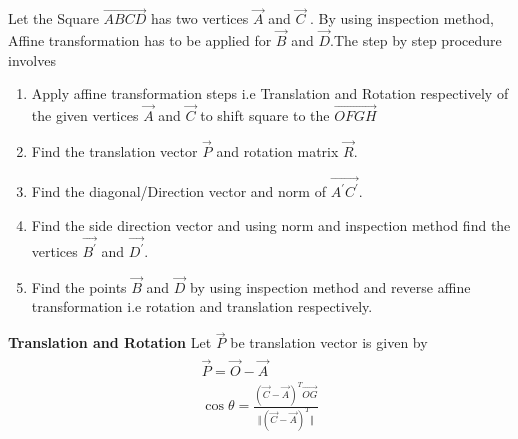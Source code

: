 \documentclass[journal,12pt,twocolumn]{IEEEtran}
\begin{document}
Let the Square $\vec{ABCD}$ has two vertices $\vec{A}$ and $\vec{C}$ . By using inspection method, Affine transformation has to be applied for $\vec{B}$ and $\vec{D}$.The step by step procedure involves
\begin{enumerate}
	\item Apply affine transformation steps i.e Translation and Rotation respectively of the given vertices $\vec{A}$ and $\vec{C}$ to shift square to the $\vec{OFGH}$ 
	\item Find the translation vector $\vec{P}$ and rotation matrix $\vec{R}$.
    \item Find the diagonal/Direction vector and norm of $\vec{A^{'}C^{'}}$.
    \item Find the side direction vector and using norm and inspection method find the vertices $\vec{B^{'}}$ and $\vec{D^{'}}$.
    \item Find the points $\vec{B}$ and $\vec{D}$ by using inspection method and reverse affine transformation i.e rotation and translation respectively.
\end{enumerate}
\textbf{Translation and Rotation}
Let $\vec{P}$ be translation vector is given by 
\begin{align}
\begin{split}
\vec{P} = \vec{O}-\vec{A}\\
\cos \theta = \frac{(\vec{C}-\vec{A})^T \vec{OG}}{\Vert(\vec{C}-\vec{A})^T\Vert}
    \end{split}
\end{align}
\end{document}
